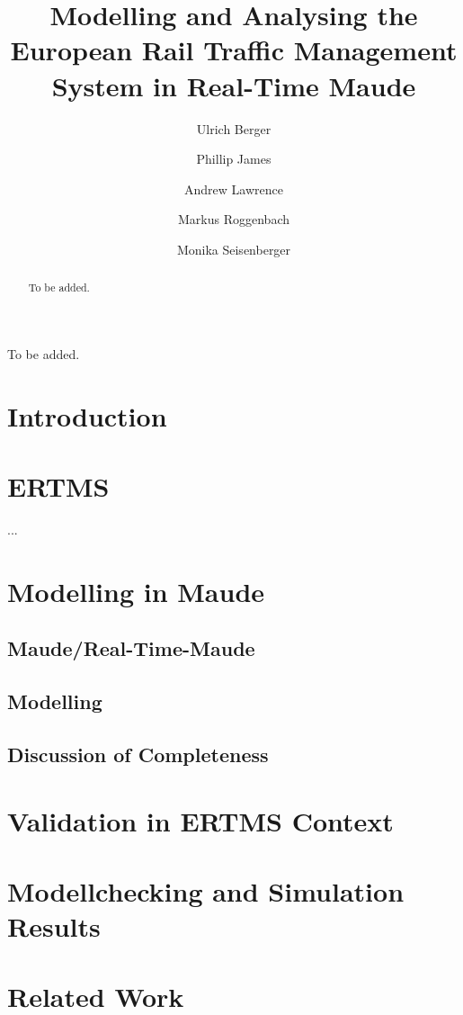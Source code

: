 \documentclass[review]{elsarticle}
\begin{document}
\begin{frontmatter}

\title{Modelling and Analysing the European Rail Traffic Management System in Real-Time Maude}



\author[swanaddress]{Ulrich Berger}
\author[swanaddress]{Phillip James}
\author[southaddress]{Andrew Lawrence}
\author[swanaddress]{Markus Roggenbach}
\author[swanaddress]{Monika Seisenberger}

\address[swanaddress]{Department of Computer Science, Swansea University, UK.}
\address[southaddress]{Hitachi Data Systems, Poole, UK.}



\begin{abstract}
To be added.
\end{abstract}

\begin{keyword}
To be added.
\end{keyword}

\end{frontmatter}

\section{Introduction}


\section{ERTMS}

...

\section{Modelling in Maude}
\subsection{Maude/Real-Time-Maude}
\subsection{Modelling}
\subsection{Discussion of Completeness}

\section{Validation in ERTMS Context}

\section{Modellchecking and Simulation Results}

\section{Related Work}


\end{document}
